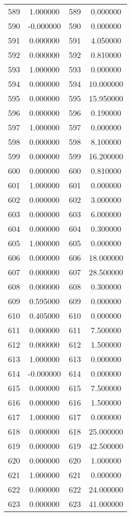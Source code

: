 \documentclass[12pt]{article}
\begin{document}
\begin{longtable}{@{}cccc@{}}
589 & 1.000000 & 589 & 0.000000 \\
590 & -0.000000 & 590 & 0.000000 \\
591 & 0.000000 & 591 & 4.050000 \\
592 & 0.000000 & 592 & 0.810000 \\
593 & 1.000000 & 593 & 0.000000 \\
594 & 0.000000 & 594 & 10.000000 \\
595 & 0.000000 & 595 & 15.950000 \\
596 & 0.000000 & 596 & 0.190000 \\
597 & 1.000000 & 597 & 0.000000 \\
598 & 0.000000 & 598 & 8.100000 \\
599 & 0.000000 & 599 & 16.200000 \\
600 & 0.000000 & 600 & 0.810000 \\
601 & 1.000000 & 601 & 0.000000 \\
602 & 0.000000 & 602 & 3.000000 \\
603 & 0.000000 & 603 & 6.000000 \\
604 & 0.000000 & 604 & 0.300000 \\
605 & 1.000000 & 605 & 0.000000 \\
606 & 0.000000 & 606 & 18.000000 \\
607 & 0.000000 & 607 & 28.500000 \\
608 & 0.000000 & 608 & 0.300000 \\
609 & 0.595000 & 609 & 0.000000 \\
610 & 0.405000 & 610 & 0.000000 \\
611 & 0.000000 & 611 & 7.500000 \\
612 & 0.000000 & 612 & 1.500000 \\
613 & 1.000000 & 613 & 0.000000 \\
614 & -0.000000 & 614 & 0.000000 \\
615 & 0.000000 & 615 & 7.500000 \\
616 & 0.000000 & 616 & 1.500000 \\
617 & 1.000000 & 617 & 0.000000 \\
618 & 0.000000 & 618 & 25.000000 \\
619 & 0.000000 & 619 & 42.500000 \\
620 & 0.000000 & 620 & 1.000000 \\
621 & 1.000000 & 621 & 0.000000 \\
622 & 0.000000 & 622 & 24.000000 \\
623 & 0.000000 & 623 & 41.000000 \\

\end{longtable}
\end{document}
